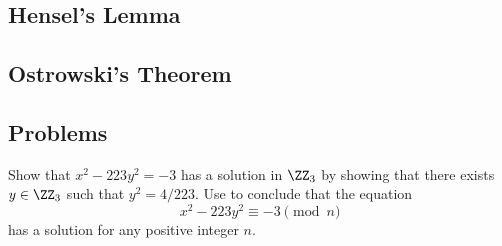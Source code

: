 \documentclass[../notes.tex]{subfiles}
\begin{document}
\subsection{Hensel's Lemma}

\subsection{Ostrowski's Theorem}

\subsection{Problems}
\begin{prob} \label{prob:223-in-z3}
	Show that $x^2-223y^2=-3$ has a solution in $\ZZ_3$ by showing that there exists $y\in\ZZ_3$ such that $y^2=4/223$. Use  to conclude that the equation
	\[x^2-223y^2\equiv-3\pmod n\]
	has a solution for any positive integer $n$.
\end{prob}




\end{document}

